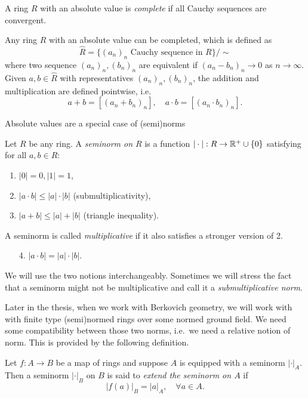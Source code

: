 \begin{definition}
	A ring $R$ with an absolute value is \emph{complete} if all Cauchy sequences are convergent. 
\end{definition}
\begin{definition}
	Any ring $R$ with an absolute value can be completed, which is defined as \[
		\widehat{R} = \{(a_n)_n \text{ Cauchy sequence in } R\} / \sim
	\] 
	where two sequence $(a_n)_n, (b_n)_n$ are equivalent if $(a_n - b_n)_n \to 0$ as $n \to \infty$.
	Given  $a, b \in \widehat{R}$ with representatives $(a_n)_n, (b_n)_n$, the addition and multiplication are defined pointwise, i.e.\ \[
		a + b = [(a_n + b_n)_n], \quad a\cdot b = [(a_n \cdot b_n)_n]
	.\]
\end{definition}

Absolute values are a special case of (semi)norms
\begin{definition}
	Let $R$ be any ring. A \emph{seminorm on $R$} is a function $|\cdot |: R \to \mathbb{R}^{+} \cup \{0\} $ satisfying for all $a, b \in R$:
	\begin{enumerate}
		\item $|0| = 0, |1| = 1$,
		\item $|a \cdot b| \le |a| \cdot |b|$  (submultiplicativity),
		\item $|a + b| \le |a| + |b|$ (triangle inequality).
	\end{enumerate}
	A seminorm is called \emph{multiplicative} if it also satisfies a stronger version of 2. 
	\begin{enumerate}
		\item [4.]  $|a \cdot  b| = |a| \cdot |b|$.
	\end{enumerate}
\end{definition}
We will use the two notions interchangeably. 
Sometimes we will stress the fact that a seminorm might not be multiplicative and call it a \emph{submultiplicative norm}. 


Later in the thesis, when we work with Berkovich geometry, we will work with with finite type (semi)normed rings over some normed ground field. 
We need some compatibility between those two norms, i.e.\ we need a relative notion of norm. 
This is provided by the following definition. 
\begin{definition}
	Let $f: A \to B$ be a map of rings and suppose $A$ is equipped with a seminorm $|\cdot |_A$. 
	Then a seminorm $|\cdot |_B$ on $B$ is said to \emph{extend the seminorm on $A$} if \[
		|f(a)|_B = |a|_A, \quad \forall a \in A
	.\] 
\end{definition}

